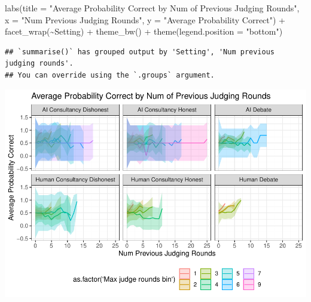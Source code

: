 \documentclass[
]{article}
\newenvironment{Shaded}{\begin{snugshade}}{\end{snugshade}}
\newcommand{\AttributeTok}[1]{\textcolor[rgb]{0.77,0.63,0.00}{#1}}
\newcommand{\FunctionTok}[1]{\textcolor[rgb]{0.00,0.00,0.00}{#1}}
\newcommand{\NormalTok}[1]{#1}
\newcommand{\SpecialCharTok}[1]{\textcolor[rgb]{0.00,0.00,0.00}{#1}}
\newcommand{\StringTok}[1]{\textcolor[rgb]{0.31,0.60,0.02}{#1}}
\begin{document}
\begin{Shaded}
\begin{Highlighting}[]
  \FunctionTok{labs}\NormalTok{(}\AttributeTok{title =} \StringTok{"Average Probability Correct by Num of Previous Judging Rounds"}\NormalTok{,}
       \AttributeTok{x =} \StringTok{"Num Previous Judging Rounds"}\NormalTok{, }
       \AttributeTok{y =} \StringTok{"Average Probability Correct"}\NormalTok{) }\SpecialCharTok{+}
  \FunctionTok{facet\_wrap}\NormalTok{(}\SpecialCharTok{\textasciitilde{}}\NormalTok{Setting) }\SpecialCharTok{+}
  \FunctionTok{theme\_bw}\NormalTok{() }\SpecialCharTok{+}
  \FunctionTok{theme}\NormalTok{(}\AttributeTok{legend.position =} \StringTok{"bottom"}\NormalTok{)}
\end{Highlighting}
\end{Shaded}

\begin{verbatim}
## `summarise()` has grouped output by 'Setting', 'Num previous judging rounds'.
## You can override using the `.groups` argument.
\end{verbatim}

\includegraphics{debate-2309_files/figure-latex/strat ggplot-13.pdf}
\end{document}
